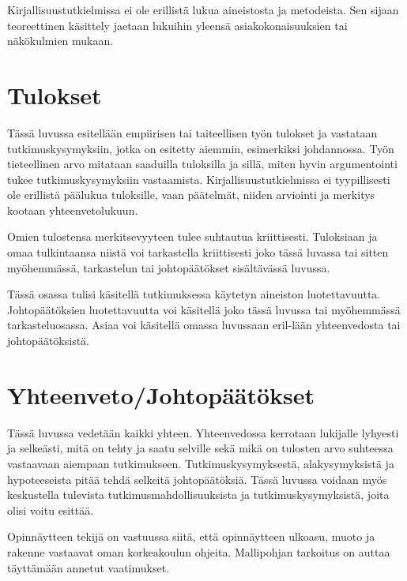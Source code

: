 \documentclass[finnish, 12pt, a4paper, arts, utf8, a-2b, online]{aaltothesis}
\begin{document}
Kirjallisuustutkielmissa ei ole erillistä lukua aineistosta ja metodeista. Sen 
sijaan teoreettinen käsittely jaetaan lukuihin yleensä asiakokonaisuuksien tai 
näkökulmien mukaan.


\clearpage
\section{Tulokset}

Tässä luvussa esitellään empiirisen tai taiteellisen työn tulokset ja vastataan 
tutkimuskysymyksiin, jotka on esitetty aiemmin, esimerkiksi johdannossa. Työn 
tieteellinen arvo mitataan saaduilla tuloksilla ja sillä, miten hyvin 
argumentointi tukee tutkimuskysymyksiin vastaamista. Kirjallisuustutkielmissa 
ei tyypillisesti ole erillistä päälukua tuloksille, vaan päätelmät, niiden 
arviointi ja merkitys kootaan yhteenvetolukuun.

Omien tulostensa merkitsevyyteen tulee suhtautua kriittisesti. Tuloksiaan ja 
omaa tulkintaansa niistä voi tarkastella kriittisesti joko tässä luvassa tai 
sitten myöhemmässä, tarkastelun tai johtopäätökset sisältävässä luvussa. 

Tässä osassa tulisi käsitellä tutkimuksessa käytetyn aineiston luotettavuutta. 
Johtopäätöksien luotettavuutta voi käsitellä joko tässä luvussa tai myöhemmässä 
tarkasteluosassa. Asiaa voi käsitellä omassa luvussaan eril-lään yhteenvedosta 
tai johtopäätöksistä.


\clearpage
\section{Yhteenveto/Johtopäätökset}
\label{luk:yhteenveto}

Tässä luvussa vedetään kaikki yhteen. Yhteenvedossa kerrotaan lukijalle 
lyhyesti ja selkeästi, mitä on tehty ja saatu selville sekä mikä on tulosten 
arvo suhteessa vastaavaan aiempaan tutkimukseen. Tutkimuskysymyksestä, 
alakysymyksistä ja hypoteeseista pitää tehdä selkeitä johtopäätöksiä. Tässä 
luvussa voidaan myös keskustella tulevista tutkimusmahdollisuuksista ja 
tutkimuskysymyksistä, joita olisi voitu esittää.

Opinnäytteen tekijä on vastuussa siitä, että opinnäytteen ulkoasu, muoto ja 
rakenne vastaavat oman korkeakoulun ohjeita. Mallipohjan tarkoitus on auttaa 
täyttämään annetut vaatimukset.
\end{document}

